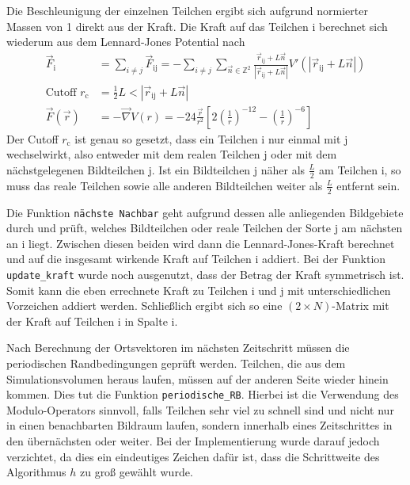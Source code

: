 Die Beschleunigung der einzelnen Teilchen ergibt sich aufgrund normierter Massen von 1
direkt aus der Kraft.
Die Kraft auf das Teilchen i berechnet sich wiederum aus dem Lennard-Jones Potential nach
\begin{align*}
    \vec{F}_\text{i}
    &= \sum_{i \neq j} \vec{F}_\text{ij}
    = - \sum_{i \neq j} \sum_{\vec{n} \in \mathbb{Z}^2}
        \frac{\vec{r}_\text{ij} + L \vec{n}}{\left|\vec{r}_\text{ij} + L \vec{n}\right|}
        V'\left(\left|\vec{r}_\text{ij} + L \vec{n}\right|\right) \\
    \text{Cutoff } r_\text{c}
    &= \frac{1}{2} L < \left|\vec{r}_\text{ij} + L \vec{n}\right| \\
    \vec{F}\!\left(\vec{r}\right)
    &= - \vec{\nabla} V\left(r\right)
    = - 24 \frac{\vec{r}}{r^2}
        \left[2 \left(\frac{1}{r}\right)^{-12} - \left(\frac{1}{r}\right)^{-6}\right]
\end{align*}
Der Cutoff $r_\text{c}$ ist genau so gesetzt, dass ein Teilchen i nur einmal mit j
wechselwirkt, also entweder mit dem realen Teilchen j oder mit dem nächstgelegenen
Bildteilchen j. Ist ein Bildteilchen j näher als $\frac{L}{2}$ am Teilchen i,
so muss das reale Teilchen sowie alle anderen Bildteilchen weiter als $\frac{L}{2}$
entfernt sein.

Die Funktion \texttt{nächste Nachbar} geht aufgrund dessen alle anliegenden Bildgebiete durch
und prüft, welches Bildteilchen oder reale Teilchen der Sorte j am nächsten an i
liegt. Zwischen diesen beiden wird dann die Lennard-Jones-Kraft berechnet und
auf die insgesamt wirkende Kraft auf Teilchen i addiert.
Bei der Funktion \texttt{update\_kraft} wurde noch ausgenutzt, dass der Betrag der
Kraft symmetrisch ist. Somit kann die eben errechnete Kraft zu Teilchen i und j mit
unterschiedlichen Vorzeichen addiert werden.
Schließlich ergibt sich so eine $(2 \times N)$-Matrix mit der Kraft auf Teilchen i
in Spalte i.

Nach Berechnung der Ortsvektoren im nächsten Zeitschritt müssen die periodischen
Randbedingungen geprüft werden.
Teilchen, die aus dem Simulationsvolumen heraus laufen, müssen auf der anderen Seite
wieder hinein kommen.
Dies tut die Funktion \texttt{periodische\_RB}.
Hierbei ist die Verwendung des Modulo-Operators sinnvoll, falls Teilchen sehr viel
zu schnell sind und nicht nur in einen benachbarten Bildraum laufen, sondern innerhalb
eines Zeitschrittes in den übernächsten oder weiter.
Bei der Implementierung wurde darauf jedoch verzichtet, da dies ein eindeutiges
Zeichen dafür ist, dass die Schrittweite des Algorithmus $h$ zu groß gewählt wurde.

